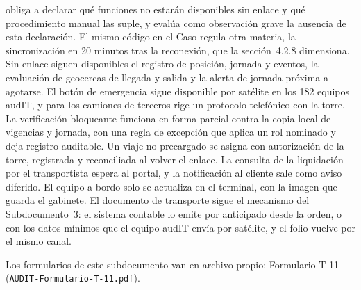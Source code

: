  obliga a declarar qué funciones no estarán disponibles sin enlace y qué
procedimiento manual las suple, y evalúa como observación grave la ausencia de esta declaración. El
mismo código en el Caso regula otra materia, la sincronización en 20 minutos tras la reconexión, que la
sección~4.2.8 dimensiona. Sin enlace
siguen disponibles el registro de posición, jornada y eventos, la evaluación de geocercas de llegada y
salida y la alerta de jornada próxima a agotarse. El botón de emergencia sigue disponible por satélite
en los 182 equipos audIT, y para los camiones de terceros rige un protocolo telefónico con la torre. La
verificación bloqueante funciona en forma parcial contra la copia local de vigencias y jornada, con una
regla de excepción que aplica un rol nominado y deja registro auditable. Un viaje no precargado se
asigna con autorización de la torre, registrada y reconciliada al volver el enlace. La consulta de la
liquidación por el transportista espera al portal, y la notificación al cliente sale como aviso
diferido. El equipo a bordo solo se actualiza en el terminal, con la imagen que guarda el gabinete. El
documento de transporte sigue el mecanismo del Subdocumento~3: el sistema contable lo emite por
anticipado desde la orden, o con los datos mínimos que el equipo audIT envía por satélite, y el folio
vuelve por el mismo canal.

Los formularios de este subdocumento van en archivo propio: Formulario T-11 (\texttt{AUDIT-Formulario-T-11.pdf}).
